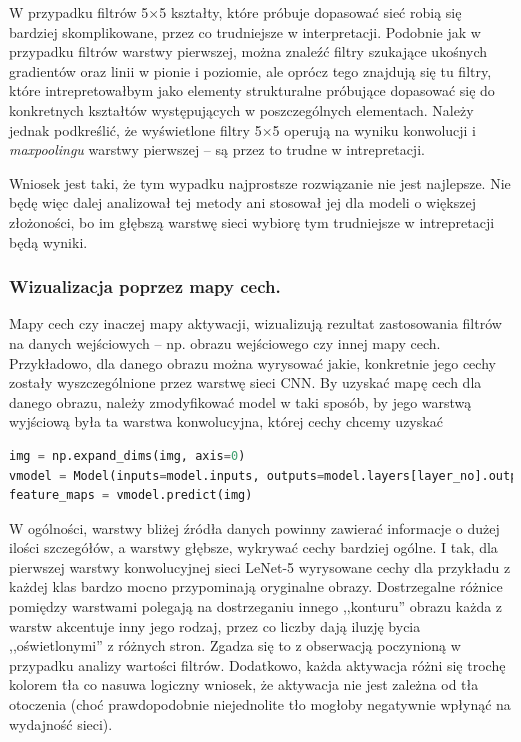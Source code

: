W przypadku filtrów 5\(\times\)5 kształty, które próbuje dopasować sieć robią się bardziej skomplikowane, przez co trudniejsze w interpretacji. Podobnie jak w przypadku filtrów warstwy pierwszej, można znaleźć filtry szukające ukośnych gradientów oraz linii w pionie i poziomie, ale oprócz tego znajdują się tu filtry, które intrepretowałbym jako elementy strukturalne próbujące dopasować się do konkretnych kształtów występujących w poszczególnych elementach. Należy jednak podkreślić, że
wyświetlone filtry 5\(\times\)5 operują na wyniku konwolucji i \textit{maxpoolingu} warstwy pierwszej -- są przez to trudne w intrepretacji.

Wniosek jest taki, że tym wypadku najprostsze rozwiązanie nie jest najlepsze. Nie będę więc dalej analizował tej metody ani stosował jej dla modeli o większej złożoności, bo im głębszą warstwę sieci wybiorę tym trudniejsze w intrepretacji będą wyniki.

\subsubsection{Wizualizacja poprzez mapy cech.}
Mapy cech czy inaczej mapy aktywacji, wizualizują rezultat zastosowania filtrów na danych wejściowych -- np. obrazu wejściowego czy innej mapy cech. Przykładowo, dla danego obrazu można wyrysować jakie, konkretnie jego cechy zostały wyszczególnione przez warstwę sieci CNN. 
By uzyskać mapę cech dla danego obrazu, należy zmodyfikować model w taki sposób, by jego warstwą wyjściową była ta warstwa konwolucyjna, której cechy chcemy uzyskać

\label{lst:lenet5keras-mapy}
\begin{lstlisting}[language=Python, caption={Uzyskiwanie mapy aktywacji dla danego modelu i obrazu w Keras.}, captionpos=b]
img = np.expand_dims(img, axis=0)
vmodel = Model(inputs=model.inputs, outputs=model.layers[layer_no].output)
feature_maps = vmodel.predict(img)
\end{lstlisting}

W ogólności, warstwy bliżej źródła danych powinny zawierać informacje o dużej ilości szczegółów, a warstwy głębsze, wykrywać cechy bardziej ogólne. I tak, 
dla pierwszej warstwy konwolucyjnej sieci LeNet-5 wyrysowane cechy dla przykładu z każdej klas bardzo mocno przypominają oryginalne obrazy. Dostrzegalne różnice pomiędzy warstwami polegają na dostrzeganiu innego ,,konturu'' obrazu każda z warstw akcentuje inny jego rodzaj, przez co liczby dają iluzję bycia ,,oświetlonymi'' z różnych stron.
Zgadza się to z obserwacją poczynioną w przypadku analizy wartości filtrów. Dodatkowo, każda aktywacja różni się trochę kolorem tła co nasuwa logiczny wniosek, że aktywacja nie jest zależna od tła otoczenia (choć prawdopodobnie niejednolite tło mogłoby negatywnie wpłynąć na wydajność sieci).

